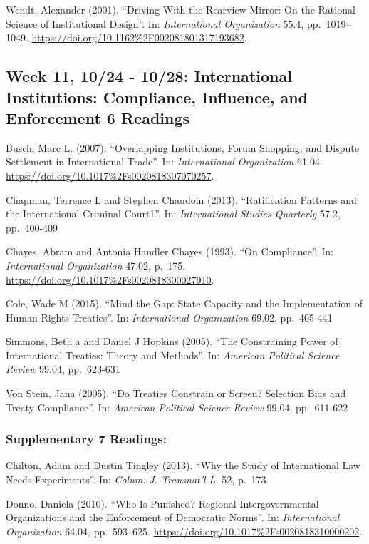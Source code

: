 \documentclass[10pt,]{article}
\begin{document}
Wendt, Alexander (2001). ``Driving With the Rearview Mirror: On the
Rational Science of Institutional Design''. In:
\emph{International Organization} 55.4, pp.~1019--1049.
\url{https://doi.org/10.1162\%2F002081801317193682}.

\subsection{Week 11, 10/24 - 10/28: International Institutions:
Compliance, Influence, and Enforcement \textbar{} 6
Readings}\label{week-11-1024---1028-international-institutions-compliance-influence-and-enforcement-6-readings}

Busch, Marc L. (2007). ``Overlapping Institutions, Forum Shopping, and
Dispute Settlement in International Trade''. In:
\emph{International Organization} 61.04.
\url{https://doi.org/10.1017\%2Fs0020818307070257}.

Chapman, Terrence L and Stephen Chaudoin (2013). ``Ratification Patterns
and the International Criminal Court1''. In:
\emph{International Studies Quarterly} 57.2, pp.~400-409

Chayes, Abram and Antonia Handler Chayes (1993). ``On Compliance''. In:
\emph{International Organization} 47.02, p.~175.
\url{https://doi.org/10.1017\%2Fs0020818300027910}.

Cole, Wade M (2015). ``Mind the Gap: State Capacity and the
Implementation of Human Rights Treaties''. In:
\emph{International Organization} 69.02, pp.~405-441

Simmons, Beth a and Daniel J Hopkins (2005). ``The Constraining Power of
International Treaties: Theory and Methods''. In:
\emph{American Political Science Review} 99.04, pp.~623-631

Von Stein, Jana (2005). ``Do Treaties Constrain or Screen? Selection
Bias and Treaty Compliance''. In:
\emph{American Political Science Review} 99.04, pp.~611-622

\subsubsection{Supplementary \textbar{} 7
Readings:}\label{supplementary-7-readings-1}

Chilton, Adam and Dustin Tingley (2013). ``Why the Study of
International Law Needs Experiments''. In:
\emph{Colum. J. Transnat'l L.} 52, p.~173.

Donno, Daniela (2010). ``Who Is Punished? Regional Intergovernmental
Organizations and the Enforcement of Democratic Norms''. In:
\emph{International Organization} 64.04, pp.~593--625.
\url{https://doi.org/10.1017\%2Fs0020818310000202}.
\end{document}
